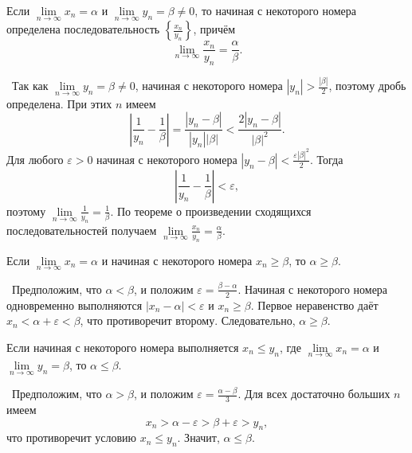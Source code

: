 \begin{theorem}
    Если \(\lim\limits_{n\to\infty}x_{n}=\alpha\) и
    \(\lim\limits_{n\to\infty}y_{n}=\beta\neq 0\), то начиная
    с некоторого номера определена последовательность
    \(\left\{\frac{x_{n}}{y_{n}}\right\}\), причём
    \[\lim\limits_{n\to\infty}\frac{x_{n}}{y_{n}}=\frac{\alpha}{\beta}.\]

    \vspace{2mm}

    \proofname~Так как
    \(\lim\limits_{n\to\infty}y_{n}=\beta\neq 0\), начиная с некоторого
    номера \(|y_{n}|>\frac{|\beta|}{2}\), поэтому дробь определена.
    При этих \(n\) имеем
    \[\left|\frac{1}{y_{n}}-\frac{1}{\beta}\right|
    =\frac{|y_{n}-\beta|}{|y_{n}||\beta|}
    <\frac{2|y_{n}-\beta|}{|\beta|^{2}}.\]
    Для любого \(\varepsilon>0\) начиная с некоторого номера
    \(|y_{n}-\beta|<\frac{\varepsilon|\beta|^{2}}{2}\). Тогда
    \[\left|\frac{1}{y_{n}}-\frac{1}{\beta}\right|<\varepsilon,\]
    поэтому \(\lim\limits_{n\to\infty}\frac{1}{y_{n}}=\frac{1}{\beta}\).
    По теореме о произведении сходящихся последовательностей получаем
    \(\lim\limits_{n\to\infty}\frac{x_{n}}{y_{n}}=\frac{\alpha}{\beta}\).~\qedsymbol
\end{theorem}

\begin{theorem}
    Если \(\lim\limits_{n\to\infty}x_{n}=\alpha\) и начиная с некоторого
    номера \(x_{n}\geq\beta\),
    то \(\alpha\geq\beta\).

    \vspace{2mm}

    \proofname~Предположим, что \(\alpha<\beta\), и положим
    \(\varepsilon=\frac{\beta-\alpha}{2}\). Начиная с некоторого
    номера одновременно выполняются \(|x_{n}-\alpha|<\varepsilon\)
    и \(x_{n}\geq\beta\). Первое неравенство даёт
    \(x_{n}<\alpha+\varepsilon<\beta\), что противоречит второму.
    Следовательно, \(\alpha\geq\beta\).~\qedsymbol
\end{theorem}

\begin{theorem}
    Если начиная с некоторого номера выполняется \(x_{n}\leq y_{n}\),
    где \(\lim\limits_{n\to\infty}x_{n}=\alpha\) и
    \(\lim\limits_{n\to\infty}y_{n}=\beta\), то \(\alpha\leq\beta\).

    \vspace{2mm}

    \proofname~Предположим, что \(\alpha>\beta\), и положим
    \(\varepsilon=\frac{\alpha-\beta}{3}\). Для всех достаточно
    больших \(n\) имеем
    \[x_{n}>\alpha-\varepsilon>\beta+\varepsilon>y_{n},\]
    что противоречит условию \(x_{n}\leq y_{n}\). Значит,
    \(\alpha\leq\beta\).~\qedsymbol
\end{theorem}

